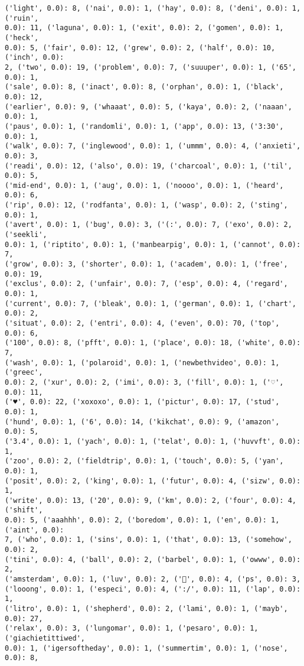 \documentclass[11pt]{article}
\begin{document}
\begin{Verbatim}[commandchars=\\\{\}]
('light', 0.0): 8, ('nai', 0.0): 1, ('hay', 0.0): 8, ('deni', 0.0): 1, ('ruin',
0.0): 11, ('laguna', 0.0): 1, ('exit', 0.0): 2, ('gomen', 0.0): 1, ('heck',
0.0): 5, ('fair', 0.0): 12, ('grew', 0.0): 2, ('half', 0.0): 10, ('inch', 0.0):
2, ('two', 0.0): 19, ('problem', 0.0): 7, ('suuuper', 0.0): 1, ('65', 0.0): 1,
('sale', 0.0): 8, ('inact', 0.0): 8, ('orphan', 0.0): 1, ('black', 0.0): 12,
('earlier', 0.0): 9, ('whaaat', 0.0): 5, ('kaya', 0.0): 2, ('naaan', 0.0): 1,
('paus', 0.0): 1, ('randomli', 0.0): 1, ('app', 0.0): 13, ('3:30', 0.0): 1,
('walk', 0.0): 7, ('inglewood', 0.0): 1, ('ummm', 0.0): 4, ('anxieti', 0.0): 3,
('readi', 0.0): 12, ('also', 0.0): 19, ('charcoal', 0.0): 1, ('til', 0.0): 5,
('mid-end', 0.0): 1, ('aug', 0.0): 1, ('noooo', 0.0): 1, ('heard', 0.0): 6,
('rip', 0.0): 12, ('rodfanta', 0.0): 1, ('wasp', 0.0): 2, ('sting', 0.0): 1,
('avert', 0.0): 1, ('bug', 0.0): 3, ('(:', 0.0): 7, ('exo', 0.0): 2, ('seekli',
0.0): 1, ('riptito', 0.0): 1, ('manbearpig', 0.0): 1, ('cannot', 0.0): 7,
('grow', 0.0): 3, ('shorter', 0.0): 1, ('academ', 0.0): 1, ('free', 0.0): 19,
('exclus', 0.0): 2, ('unfair', 0.0): 7, ('esp', 0.0): 4, ('regard', 0.0): 1,
('current', 0.0): 7, ('bleak', 0.0): 1, ('german', 0.0): 1, ('chart', 0.0): 2,
('situat', 0.0): 2, ('entri', 0.0): 4, ('even', 0.0): 70, ('top', 0.0): 6,
('100', 0.0): 8, ('pfft', 0.0): 1, ('place', 0.0): 18, ('white', 0.0): 7,
('wash', 0.0): 1, ('polaroid', 0.0): 1, ('newbethvideo', 0.0): 1, ('greec',
0.0): 2, ('xur', 0.0): 2, ('imi', 0.0): 3, ('fill', 0.0): 1, ('♡', 0.0): 11,
('♥', 0.0): 22, ('xoxoxo', 0.0): 1, ('pictur', 0.0): 17, ('stud', 0.0): 1,
('hund', 0.0): 1, ('6', 0.0): 14, ('kikchat', 0.0): 9, ('amazon', 0.0): 5,
('3.4', 0.0): 1, ('yach', 0.0): 1, ('telat', 0.0): 1, ('huvvft', 0.0): 1,
('zoo', 0.0): 2, ('fieldtrip', 0.0): 1, ('touch', 0.0): 5, ('yan', 0.0): 1,
('posit', 0.0): 2, ('king', 0.0): 1, ('futur', 0.0): 4, ('sizw', 0.0): 1,
('write', 0.0): 13, ('20', 0.0): 9, ('km', 0.0): 2, ('four', 0.0): 4, ('shift',
0.0): 5, ('aaahhh', 0.0): 2, ('boredom', 0.0): 1, ('en', 0.0): 1, ('aint', 0.0):
7, ('who', 0.0): 1, ('sins', 0.0): 1, ('that', 0.0): 13, ('somehow', 0.0): 2,
('tini', 0.0): 4, ('ball', 0.0): 2, ('barbel', 0.0): 1, ('owww', 0.0): 2,
('amsterdam', 0.0): 1, ('luv', 0.0): 2, ('💖', 0.0): 4, ('ps', 0.0): 3,
('looong', 0.0): 1, ('especi', 0.0): 4, (':/', 0.0): 11, ('lap', 0.0): 1,
('litro', 0.0): 1, ('shepherd', 0.0): 2, ('lami', 0.0): 1, ('mayb', 0.0): 27,
('relax', 0.0): 3, ('lungomar', 0.0): 1, ('pesaro', 0.0): 1, ('giachietittiwed',
0.0): 1, ('igersoftheday', 0.0): 1, ('summertim', 0.0): 1, ('nose', 0.0): 8,

\end{Verbatim}
\end{document}
